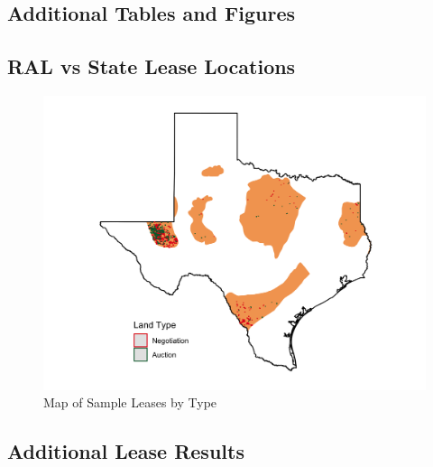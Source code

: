 \documentclass[12pt]{article}
\begin{document}
\singlespace




\pagebreak

\begin{appendices}

\section{Additional Tables and Figures}

\setcounter{figure}{0}  \renewcommand{\thefigure}{A.\arabic{figure}} 
\setcounter{table}{0}  \renewcommand{\thetable}{A.\arabic{table}} 

\subsection{RAL vs State Lease Locations}
\begin{figure}[H]
\begin{centering}
\caption{Map of Sample Leases by Type \label{fig:RAL_map}}
\vspace{-10pt}
\includegraphics[width=1\textwidth]{../output/figures/glo_leases_in_texas.png}
\par\end{centering}
\end{figure}

\subsection{Additional Lease Results}\label{sec:extra_regressions}


\end{appendices}
\end{document}
